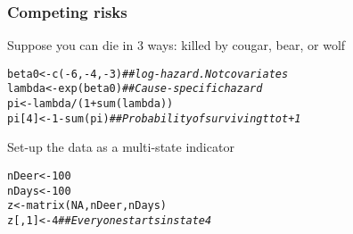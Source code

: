 \documentclass[color=usenames,dvipsnames]{beamer}\usepackage[]{graphicx}\usepackage[]{color}
\makeatletter
\newcommand{\hlnum}[1]{\textcolor[rgb]{0.69,0.494,0}{#1}}%
\newcommand{\hlcom}[1]{\textcolor[rgb]{0.514,0.506,0.514}{\textit{#1}}}%
\newcommand{\hlopt}[1]{\textcolor[rgb]{0,0,0}{#1}}%
\newcommand{\hlstd}[1]{\textcolor[rgb]{0,0,0}{#1}}%
\newcommand{\hlkwb}[1]{\textcolor[rgb]{0,0.341,0.682}{#1}}%
\newcommand{\hlkwd}[1]{\textcolor[rgb]{0.004,0.004,0.506}{#1}}%
\newenvironment{kframe}{%
 \def\at@end@of@kframe{}%
 \ifinner\ifhmode%
  \def\at@end@of@kframe{\end{minipage}}%
  \begin{minipage}{\columnwidth}%
 \fi\fi%
 \def\FrameCommand##1{\hskip\@totalleftmargin \hskip-\fboxsep
 \colorbox{shadecolor}{##1}\hskip-\fboxsep
     \hskip-\linewidth \hskip-\@totalleftmargin \hskip\columnwidth}%
 \MakeFramed {\advance\hsize-\width
   \@totalleftmargin\z@ \linewidth\hsize
   \@setminipage}}%
 {\par\unskip\endMakeFramed%
 \at@end@of@kframe}
\newenvironment{knitrout}{}{} %
\makeatother
\begin{document}
\begin{frame}[fragile]
  \frametitle{Competing risks}
  Suppose you can die in 3 ways: killed by cougar, bear, or wolf
\begin{knitrout}\small
{}\color{fgcolor}\begin{kframe}
\begin{alltt}
\hlstd{beta0} \hlkwb{<-} \hlkwd{c}\hlstd{(}\hlopt{-}\hlnum{6}\hlstd{,} \hlopt{-}\hlnum{4}\hlstd{,} \hlopt{-}\hlnum{3}\hlstd{)} \hlcom{## log-hazard. Not covariates}
\hlstd{lambda} \hlkwb{<-} \hlkwd{exp}\hlstd{(beta0)}   \hlcom{## Cause-specific hazard}
\hlstd{pi} \hlkwb{<-} \hlstd{lambda} \hlopt{/} \hlstd{(}\hlnum{1}\hlopt{+}\hlkwd{sum}\hlstd{(lambda))}
\hlstd{pi[}\hlnum{4}\hlstd{]} \hlkwb{<-} \hlnum{1}\hlopt{-}\hlkwd{sum}\hlstd{(pi)}     \hlcom{## Probability of surviving t to t+1}
\end{alltt}
\end{kframe}
\end{knitrout}
\pause
\vfill
  Set-up the data as a multi-state indicator
\begin{knitrout}\small
{}\color{fgcolor}\begin{kframe}
\begin{alltt}
\hlstd{nDeer} \hlkwb{<-} \hlnum{100}
\hlstd{nDays} \hlkwb{<-} \hlnum{100}
\hlstd{z} \hlkwb{<-} \hlkwd{matrix}\hlstd{(}\hlnum{NA}\hlstd{, nDeer, nDays)}
\hlstd{z[,}\hlnum{1}\hlstd{]} \hlkwb{<-} \hlnum{4}  \hlcom{## Everyone starts in state 4}
\end{alltt}
\end{kframe}
\end{knitrout}
\end{frame}
\end{document}
